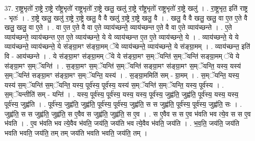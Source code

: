 \documentclass[17pt]{extarticle}
\begin{document}
37. रा॒ष्ट्र॒भृतो॑ रा॒ष्ट्रे रा॒ष्ट्रे रा᳚ष्ट्र॒भृतो॑ राष्ट्र॒भृतो॑ रा॒ष्ट्रे खलु॒ खलु॑ रा॒ष्ट्रे रा᳚ष्ट्र॒भृतो॑ राष्ट्र॒भृतो॑ रा॒ष्ट्रे खलु॑ । . रा॒ष्ट्र॒भृत॒ इति॑ राष्ट्र - भृतः॑ । . रा॒ष्ट्रे खलु॒ खलु॑ रा॒ष्ट्रे रा॒ष्ट्रे खलु॒ वै वै खलु॑ रा॒ष्ट्रे रा॒ष्ट्रे खलु॒ वै । . खलु॒ वै वै खलु॒ खलु॒ वा ए॒त ए॒ते वै खलु॒ खलु॒ वा ए॒ते । . वा ए॒त ए॒ते वै वा ए॒ते व्याय॑च्छन्ते॒ व्याय॑च्छन्त ए॒ते वै वा ए॒ते व्याय॑च्छन्ते । . ए॒ते व्याय॑च्छन्ते॒ व्याय॑च्छन्त ए॒त ए॒ते व्याय॑च्छन्ते॒ ये ये व्याय॑च्छन्त ए॒त ए॒ते व्याय॑च्छन्ते॒ ये । . व्याय॑च्छन्ते॒ ये ये व्याय॑च्छन्ते॒ व्याय॑च्छन्ते॒ ये स॑ङ्ग्रा॒मꣳ स॑ङ्ग्रा॒मम् ॅये व्याय॑च्छन्ते॒ व्याय॑च्छन्ते॒ ये स॑ङ्ग्रा॒मम् । . व्याय॑च्छन्त॒ इति॑ वि - आय॑च्छन्ते । . ये स॑ङ्ग्रा॒मꣳ स॑ङ्ग्रा॒मम् ॅये ये स॑ङ्ग्रा॒मꣳ स॒म्ॅयन्ति॑ स॒म्ॅयन्ति॑ सङ्ग्रा॒मम् ॅये ये स॑ङ्ग्रा॒मꣳ स॒म्ॅयन्ति॑ । . स॒ङ्ग्रा॒मꣳ स॒म्ॅयन्ति॑ स॒म्ॅयन्ति॑ सङ्ग्रा॒मꣳ स॑ङ्ग्रा॒मꣳ स॒म्ॅयन्ति॒ यस्य॒ यस्य॑ स॒म्ॅयन्ति॑ सङ्ग्रा॒मꣳ स॑ङ्ग्रा॒मꣳ स॒म्ॅयन्ति॒ यस्य॑ । . स॒ङ्ग्रा॒ममिति॑ सम् - ग्रा॒मम् । . स॒म्ॅयन्ति॒ यस्य॒ यस्य॑ स॒म्ॅयन्ति॑ स॒म्ॅयन्ति॒ यस्य॒ पूर्व॑स्य॒ पूर्व॑स्य॒ यस्य॑ स॒म्ॅयन्ति॑ स॒म्ॅयन्ति॒ यस्य॒ पूर्व॑स्य । . स॒म्ॅयन्तीति॑ सम् - यन्ति॑ । . यस्य॒ पूर्व॑स्य॒ पूर्व॑स्य॒ यस्य॒ यस्य॒ पूर्व॑स्य॒ जुह्व॑ति॒ जुह्व॑ति॒ पूर्व॑स्य॒ यस्य॒ यस्य॒ पूर्व॑स्य॒ जुह्व॑ति । . पूर्व॑स्य॒ जुह्व॑ति॒ जुह्व॑ति॒ पूर्व॑स्य॒ पूर्व॑स्य॒ जुह्व॑ति॒ स स जुह्व॑ति॒ पूर्व॑स्य॒ पूर्व॑स्य॒ जुह्व॑ति॒ सः । . जुह्व॑ति॒ स स जुह्व॑ति॒ जुह्व॑ति॒ स ए॒वैव स जुह्व॑ति॒ जुह्व॑ति॒ स ए॒व । . स ए॒वैव स स ए॒व भ॑वति भव त्ये॒व स स ए॒व भ॑वति । . ए॒व भ॑वति भव त्ये॒वैव भ॑वति॒ जय॑ति॒ जय॑ति भव त्ये॒वैव भ॑वति॒ जय॑ति । . भ॒व॒ति॒ जय॑ति॒ जय॑ति भवति भवति॒ जय॑ति॒ तम् तम् जय॑ति भवति भवति॒ जय॑ति॒ तम् । \newline
\end{document}
